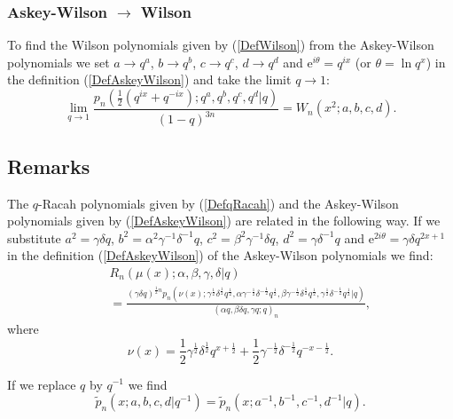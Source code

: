 \documentclass[envcountchap,graybox]{svmono}
\newcounter{rom}
\newcommand{\e}{\textrm{e}}
\begin{document}
\subsubsection*{Askey-Wilson $\rightarrow$ Wilson}
To find the Wilson polynomials given by (\ref{DefWilson}) from the Askey-Wilson polynomials we
set $a\rightarrow q^a$, $b\rightarrow q^b$, $c\rightarrow q^c$, $d\rightarrow q^d$ and
$\e^{i\theta}=q^{ix}$ (or $\theta=\ln q^x$) in the definition (\ref{DefAskeyWilson}) and
take the limit $q\rightarrow 1$:
\begin{equation}
\lim_{q\rightarrow 1}\frac{p_n(\frac{1}{2}\left(q^{ix}+q^{-ix}\right);q^a,q^b,q^c,q^d|q)}{(1-q)^{3n}}=W_n(x^2;a,b,c,d).
\end{equation}

\subsection*{Remarks}
The $q$-Racah polynomials given by (\ref{DefqRacah}) and the Askey-Wilson
polynomials given by (\ref{DefAskeyWilson}) are related in the following way.
If we substitute $a^2=\gamma\delta q$, $b^2=\alpha^2\gamma^{-1}\delta^{-1}q$,
$c^2=\beta^2\gamma^{-1}\delta q$, $d^2=\gamma\delta^{-1}q$ and $\e^{2i\theta}=\gamma\delta q^{2x+1}$
in the definition (\ref{DefAskeyWilson})
of the Askey-Wilson polynomials we find:
\begin{eqnarray*}
& &R_n(\mu(x);\alpha,\beta,\gamma,\delta|q)\\
& &{}=\frac{(\gamma\delta q)^{\frac{1}{2}n}
p_n(\nu(x);\gamma^{\frac{1}{2}}\delta^{\frac{1}{2}}q^{\frac{1}{2}},
\alpha\gamma^{-\frac{1}{2}}\delta^{-\frac{1}{2}}q^{\frac{1}{2}},
\beta\gamma^{-\frac{1}{2}}\delta^{\frac{1}{2}}q^{\frac{1}{2}},
\gamma^{\frac{1}{2}}\delta^{-\frac{1}{2}}q^{\frac{1}{2}}|q)}{(\alpha q,\beta\delta q,\gamma q;q)_n},
\end{eqnarray*}
where
$$\nu(x)=\textstyle\frac{1}{2}\gamma^{\frac{1}{2}}\delta^{\frac{1}{2}}q^{x+\frac{1}{2}}
+\textstyle\frac{1}{2}\gamma^{-\frac{1}{2}}\delta^{-\frac{1}{2}}q^{-x-\frac{1}{2}}.$$

\noindent
If we replace $q$ by $q^{-1}$ we find
$${\tilde p}_n(x;a,b,c,d|q^{-1})={\tilde p}_n(x;a^{-1},b^{-1},c^{-1},d^{-1}|q).$$
\end{document}
